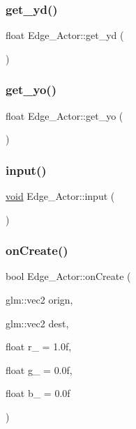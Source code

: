 \subsubsection{\texorpdfstring{get\+\_\+yd()}{get\_yd()}}
{\footnotesize\ttfamily float Edge\+\_\+\+Actor\+::get\+\_\+yd (\begin{DoxyParamCaption}{ }\end{DoxyParamCaption})\hspace{0.3cm}{\ttfamily [inline]}}

\mbox{\label{classEdge__Actor_a7964c3bdf20a1928abad4ffc59fd11bd}} 
\subsubsection{\texorpdfstring{get\+\_\+yo()}{get\_yo()}}
{\footnotesize\ttfamily float Edge\+\_\+\+Actor\+::get\+\_\+yo (\begin{DoxyParamCaption}{ }\end{DoxyParamCaption})\hspace{0.3cm}{\ttfamily [inline]}}

\mbox{\label{classEdge__Actor_a9f2bf6813472357c045d48cd76658e30}} 
\subsubsection{\texorpdfstring{input()}{input()}}
{\footnotesize\ttfamily \hyperlink{imgui__impl__opengl3__loader_8h_ac668e7cffd9e2e9cfee428b9b2f34fa7}{void} Edge\+\_\+\+Actor\+::input (\begin{DoxyParamCaption}{ }\end{DoxyParamCaption})}

\mbox{\label{classEdge__Actor_a0d8e90af66e85a8f4d1f5b0ecde6e99e}} 
\subsubsection{\texorpdfstring{on\+Create()}{onCreate()}}
{\footnotesize\ttfamily bool Edge\+\_\+\+Actor\+::on\+Create (\begin{DoxyParamCaption}\item[{glm\+::vec2}]{orign,  }\item[{glm\+::vec2}]{dest,  }\item[{float}]{r\+\_\+ = {\ttfamily 1.0f},  }\item[{float}]{g\+\_\+ = {\ttfamily 0.0f},  }\item[{float}]{b\+\_\+ = {\ttfamily 0.0f} }\end{DoxyParamCaption})}

